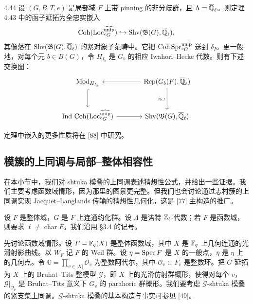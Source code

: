 \begin{thm}{4.44}\label{thm:a2-4-44}
设 $(G,B,T,e)$ 是局部域 $F$ 上带 pinning 的非分歧群，且 $\Lambda=\overline{\mathbb{Q}}_\ell$。则定理 4.43 中的函子延拓为全忠实嵌入
\[
\operatorname{Coh}(\operatorname{Loc}^{\widehat{\mathrm{unip}}}_{{}^{c}G})\hookrightarrow\mathrm{Shv}(\mathfrak B(G),\overline{\mathbb{Q}}_\ell),
\]
其像落在 $\mathrm{Shv}(\mathfrak B(G),\overline{\mathbb{Q}}_\ell)$ 的紧对象子范畴中。它把 $\operatorname{Coh}\mathrm{Spr}^{\mathrm{unip}}_{{}^{c}G}$ 送到 $\delta_I$。更一般地，对每个元 $b\in B(G)$，令 $H_{I_b}$ 是 $G_b$ 的相应 Iwahori–Hecke 代数。则有下述交换图：
\[
\begin{tikzcd}[column sep=large,row sep=large]
\mathrm{Mod}_{H_{I_b}} \arrow[d, hook] & \Rep(G_b(F),\overline\Q_\ell) \arrow[l] \arrow[d, "i_{b,!}"'] \\
\mathrm{Ind}\,\Coh(\Loc^{\widehat{\mathrm{unip}}}_{{}^{c}G}) \arrow[r] & \mathrm{Shv}(\mathfrak B(G),\overline\Q_\ell)
\end{tikzcd}
\]
\end{thm}

定理中嵌入的更多性质将在 [88] 中研究。

\subsection{模簇的上同调与局部–整体相容性}\label{sec:a2-4-7}

在本小节中，我们对 shtuka 模叠的上同调表述猜想性公式，并给出一些证据。我们主要考虑函数域情形，因为那里的图景更完整。但我们也会讨论通过志村簇的上同调实现 Jacquet–Langlands 传输的猜想性几何化，这是 [77] 主构造的推广。

设 $F$ 是整体域，$G$ 是 $F$ 上连通约化群。设 $\Lambda$ 是诺特 $\mathbb{Z}_\ell$-代数；若 $F$ 是函数域，则要求 $\ell\ne\operatorname{char}F$。我们沿用 §3.4 的记号。

先讨论函数域情形。设 $F=\mathbb{F}_q(X)$ 是整体函数域，其中 $X$ 是 $\mathbb{F}_q$ 上几何连通的光滑射影曲线。以 $W_F$ 记 $F$ 的 Weil 群。设 $\eta=\operatorname{Spec} F$ 是 $X$ 的一般点，$\bar\eta$ 是 $\eta$ 上的几何点。令 $\mathbb O=\prod_{v\in|X|}\mathcal O_v$ 为整数阿代尔，其中 $\mathcal O_v\subset F_v$ 是整数环。把 $G$ 延拓为 $X$ 上的 Bruhat–Tits 整模型 $\mathcal G$，即 $X$ 上的光滑仿射群概形，使得对每个 $v$，$\mathcal G|_{\mathcal O_v}$ 是 Bruhat–Tits 意义下 $G_v$ 的 parahoric 群概形。我们要考虑 $\mathcal G$-shtuka 模叠的紧支集上同调。$\mathcal G$-shtuka 模叠的基本构造与事实可参见 [49]。

